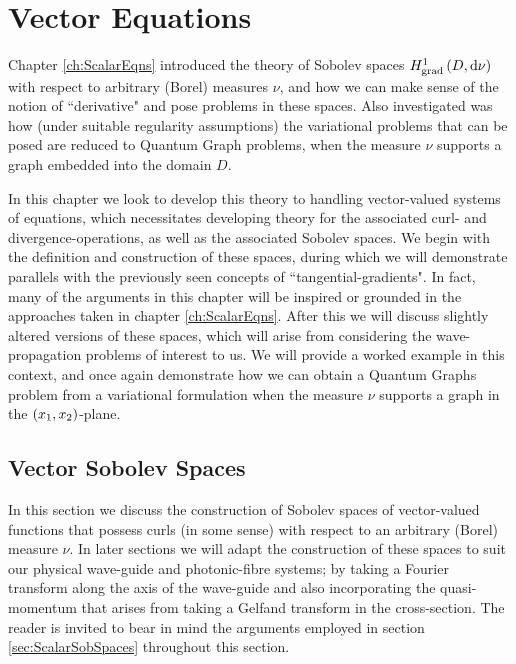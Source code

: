 \chapter{Vector Equations} \label{ch:VectorEqns}
Chapter \ref{ch:ScalarEqns} introduced the theory of Sobolev spaces $H^1_\mathrm{grad}\left( D, \mathrm{d}\nu \right)$ with respect to arbitrary (Borel) measures $\nu$, and how we can make sense of the notion of ``derivative" and pose problems in these spaces.
Also investigated was how (under suitable regularity assumptions) the variational problems that can be posed are reduced to Quantum Graph problems, when the measure $\nu$ supports a graph embedded into the domain $D$. \newline

In this chapter we look to develop this theory to handling vector-valued systems of equations, which necessitates developing theory for the associated curl- and divergence-operations, as well as the associated Sobolev spaces.
We begin with the definition and construction of these spaces, during which we will demonstrate parallels with the previously seen concepts of ``tangential-gradients".
In fact, many of the arguments in this chapter will be inspired or grounded in the approaches taken in chapter \ref{ch:ScalarEqns}.
After this we will discuss slightly altered versions of these spaces, which will arise from considering the wave-propagation problems of interest to us.
We will provide a worked example in this context, and once again demonstrate how we can obtain a Quantum Graphs problem from a variational formulation when the measure $\nu$ supports a graph in the $\left( x_1,x_2 \right)$-plane.

\section{Vector Sobolev Spaces} \label{sec:VectorSobSpaces}
In this section we discuss the construction of Sobolev spaces of vector-valued functions that possess curls (in some sense) with respect to an arbitrary (Borel) measure $\nu$.
In later sections we will adapt the construction of these spaces to suit our physical wave-guide and photonic-fibre systems; by taking a Fourier transform along the axis of the wave-guide and also incorporating the quasi-momentum that arises from taking a Gelfand transform in the cross-section.
The reader is invited to bear in mind the arguments employed in section \ref{sec:ScalarSobSpaces} throughout this section. \newline

